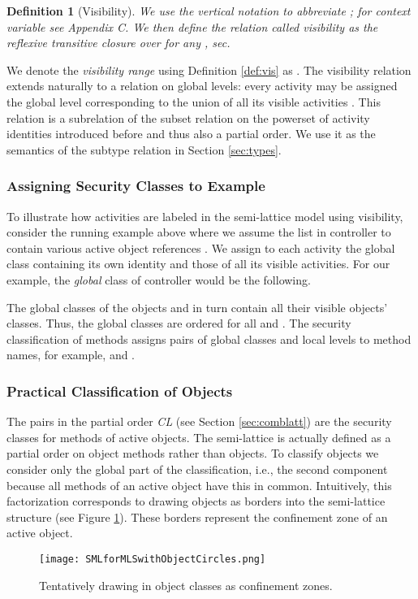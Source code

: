 \documentclass[10pt, conference, compsocconf]{IEEEtran}
\newtheorem{definition}{Definition}[section]
\begin{document}
{\begin{definition}[Visibility]
We use the vertical notation  to abbreviate ; 
for context variable  see Appendix C.
We then define the relation called {\em visibility}  
as the {\it reflexive transitive closure} over  for any , {\it sec}. \hfill
\end{definition}
We denote the {\it visibility range} using Definition \ref{def:vis} as
.
The visibility relation
extends naturally to a relation  on global levels: every activity 
may be assigned the global level corresponding to the union of all its visible activities
.
This relation is a subrelation of the subset relation on the powerset of activity identities
introduced before and thus also a partial order. 
We use it as the semantics of the subtype relation in Section \ref{sec:types}.

\subsubsection*{Assigning Security Classes to Example}
To illustrate how activities are labeled in the semi-lattice model using visibility, 
consider the running example above where we assume the list in controller  to contain
various active object references .
We assign to each activity the global class containing its own identity and those of all 
its visible activities. 
For our example, the {\it global} class of controller  would 
be the following. 

The global classes  of the  objects and  in turn
contain all their visible objects' classes.
Thus, the global classes are ordered  for all  and 
. The security classification of methods assigns
pairs of global classes and local levels to method names, for example,
 and .

\subsubsection*{Practical Classification of Objects}
The pairs  in the partial order {\it CL} (see Section \ref{sec:comblatt})
are the security classes for methods of active objects. 
The semi-lattice is actually defined as a partial order on object methods rather than objects.
To classify objects we consider only the global part of the classification, i.e., the second
 component because all methods of an active object have this  in common.
Intuitively, this factorization corresponds to drawing objects as borders into the
semi-lattice structure (see Figure \ref{fig:slmmlsobj}). These borders represent the confinement zone
of an active object.  
\begin{figure}
\vspace{-3ex}
\begin{center}
\texttt{[image: SMLforMLSwithObjectCircles.png]}
\end{center}
\vspace{-3ex}
\caption{
Tentatively drawing in object classes as confinement zones.
\label{fig:slmmlsobj}}
\vspace{-3ex}
\end{figure}

}
\end{document}
